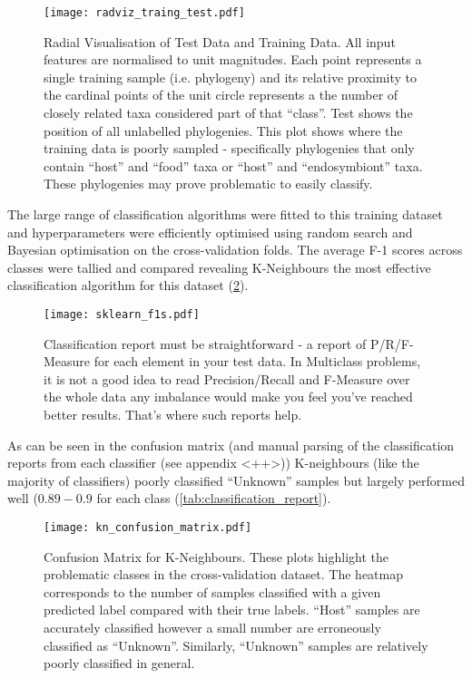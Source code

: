 \begin{figure}[h]
		\centering
		\texttt{[image: radviz\_traing\_test.pdf]}
		\caption{Radial Visualisation of Test Data and Training Data. All input features are normalised to 
			unit magnitudes.  Each point represents a single training sample (i.e. phylogeny) and its relative proximity
			to the cardinal points of the unit circle represents a the number of closely related taxa considered part of
			that ``class''. 
			Test shows the position of all unlabelled phylogenies.  This plot shows where the training 
			data is poorly sampled - specifically phylogenies that only contain ``host'' and ``food'' taxa or
			``host'' and ``endosymbiont'' taxa.  These phylogenies may prove problematic to easily classify.}
		\label{fig:radvis_test}
\end{figure}


The large range of classification algorithms were fitted to this training dataset and
hyperparameters were efficiently optimised using random search and Bayesian optimisation on
the cross-validation folds. The average F-1 scores across classes were tallied and compared 
revealing K-Neighbours the most effective classification algorithm for this dataset (\cref{fig:f1_scores}).

\begin{figure}[h]
	\centering
	\texttt{[image: sklearn\_f1s.pdf]}
	\caption{Classification report must be straightforward - a report of P/R/F-Measure for each element in your test data. In Multiclass problems, it is not a good idea to read Precision/Recall and F-Measure over the whole data any imbalance would make you feel you've reached better results. That's where such reports help.}
	\label{fig:f1_scores} 
\end{figure}


As can be seen in the confusion matrix (and manual parsing of the classification reports
from each classifier (see appendix <++>)) K-neighbours (like the majority of classifiers)
poorly classified ``Unknown'' samples but largely performed well (\(0.89-0.9\) for each class
(\cref{tab:classification_report}). 

\begin{figure}[h]
	\centering
	\texttt{[image: kn\_confusion\_matrix.pdf]}
	\caption{Confusion Matrix for K-Neighbours.  These plots highlight
		the problematic classes in the cross-validation dataset. 
		 The heatmap corresponds to the number of samples classified
		 with a given predicted label compared with their true labels.
		``Host'' samples are accurately classified however a small number are erroneously
		classified as ``Unknown''.  Similarly, ``Unknown'' samples are relatively poorly
		classified in general.}
	\label{fig:confusion matrices} 
\end{figure}


